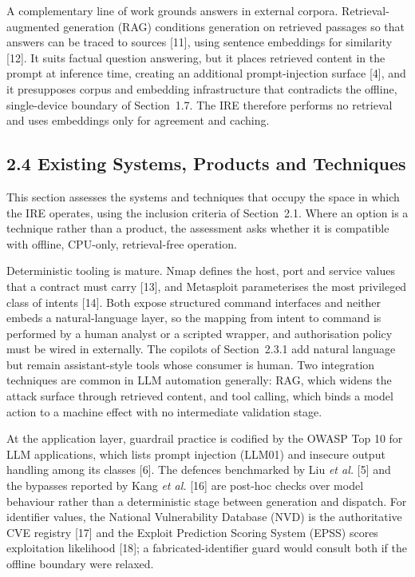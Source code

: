 \documentclass[
]{article}
\begin{document}
A complementary line of work grounds answers in external corpora.
Retrieval-augmented generation (RAG) conditions generation on retrieved
passages so that answers can be traced to sources {[}11{]}, using
sentence embeddings for similarity {[}12{]}. It suits factual question
answering, but it places retrieved content in the prompt at inference
time, creating an additional prompt-injection surface {[}4{]}, and it
presupposes corpus and embedding infrastructure that contradicts the
offline, single-device boundary of Section~1.7. The IRE therefore
performs no retrieval and uses embeddings only for agreement and
caching.

\hypertarget{existing-systems-products-and-techniques}{%
\subsection{2.4 Existing Systems, Products and
Techniques}\label{existing-systems-products-and-techniques}}

This section assesses the systems and techniques that occupy the space
in which the IRE operates, using the inclusion criteria of Section~2.1.
Where an option is a technique rather than a product, the assessment
asks whether it is compatible with offline, CPU-only, retrieval-free
operation.

Deterministic tooling is mature. Nmap defines the host, port and service
values that a contract must carry {[}13{]}, and Metasploit parameterises
the most privileged class of intents {[}14{]}. Both expose structured
command interfaces and neither embeds a natural-language layer, so the
mapping from intent to command is performed by a human analyst or a
scripted wrapper, and authorisation policy must be wired in externally.
The copilots of Section~2.3.1 add natural language but remain
assistant-style tools whose consumer is human. Two integration
techniques are common in LLM automation generally: RAG, which widens the
attack surface through retrieved content, and tool calling, which binds
a model action to a machine effect with no intermediate validation
stage.

At the application layer, guardrail practice is codified by the OWASP
Top 10 for LLM applications, which lists prompt injection (LLM01) and
insecure output handling among its classes {[}6{]}. The defences
benchmarked by Liu \emph{et al.} {[}5{]} and the bypasses reported by
Kang \emph{et al.} {[}16{]} are post-hoc checks over model behaviour
rather than a deterministic stage between generation and dispatch. For
identifier values, the National Vulnerability Database (NVD) is the
authoritative CVE registry {[}17{]} and the Exploit Prediction Scoring
System (EPSS) scores exploitation likelihood {[}18{]}; a
fabricated-identifier guard would consult both if the offline boundary
were relaxed.
\end{document}
